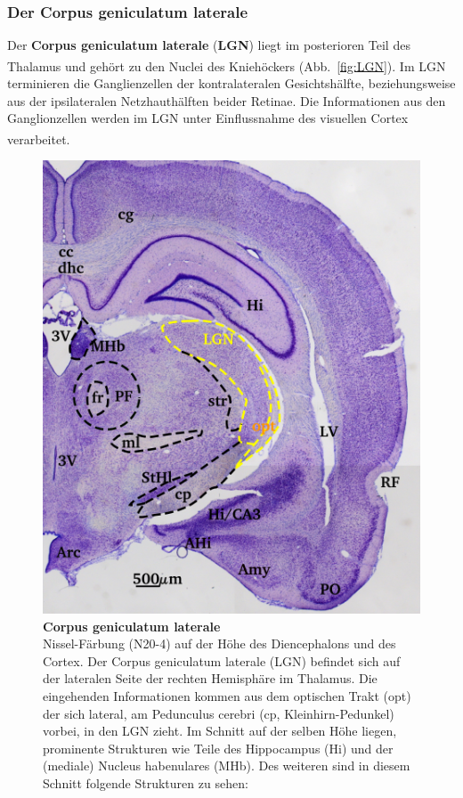 \documentclass[12pt,a4paper,pdftex]{article}
\begin{document}
\newpage
\subsubsection*{Der Corpus geniculatum laterale}

Der \textbf{Corpus geniculatum laterale} (\textbf{LGN})  liegt im posterioren Teil des Thalamus und gehört zu den Nuclei des Kniehöckers (Abb.~\ref{fig:LGN}). \textsuperscript{\cite[12]{crossman2014neuroanatomy}} Im LGN terminieren die Ganglienzellen der kontralateralen Gesichtshälfte, beziehungsweise aus der ipsilateralen Netzhauthälften beider Retinae. Die Informationen aus den Ganglionzellen werden im LGN unter Einflussnahme des visuellen Cortex verarbeitet.
\textsuperscript{\cite[8.1]{trepel2011neuroanatomie}}

\begin{figure}[H]
    \centering
    \includegraphics{pictures/visual/LGN.png}
    \caption[Corpus geniculatum laterale]{\textbf{Corpus geniculatum laterale}\\
    Nissel-Färbung (N20-4) auf der Höhe des Diencephalons und des Cortex. Der Corpus geniculatum laterale (LGN) befindet sich auf der lateralen Seite der rechten Hemisphäre im Thalamus. Die eingehenden Informationen kommen aus dem optischen Trakt (opt) der sich lateral, am Pedunculus cerebri (cp, Kleinhirn-Pedunkel) vorbei, in den LGN zieht. Im Schnitt auf der selben Höhe liegen, prominente Strukturen wie Teile des Hippocampus (Hi) und der (mediale) Nucleus habenulares (MHb). Des weiteren sind in diesem Schnitt folgende Strukturen zu sehen: 
}
\end{figure}
\end{document}
